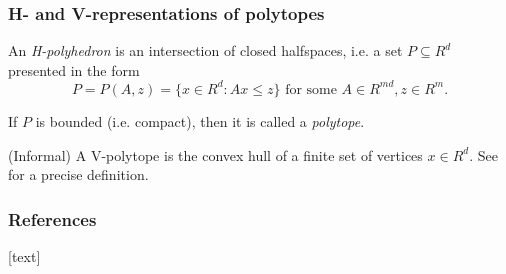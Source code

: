 \begin{frame}
\frametitle{H- and V-representations of polytopes}

\begin{definition}
An \emph{H-polyhedron} is an intersection of closed halfspaces, i.e. a set $P \subseteq R^d$ presented in the form
\begin{equation*}
P = P(A,z)=\{ x \in R^d: Ax \leq z\} \textrm{ for some } A \in R^{m d}, z \in R^m.
\end{equation*}
\end{definition}

If $P$ is bounded (i.e. compact), then it is called a \emph{polytope}.

\begin{definition}
(Informal) A V-polytope is the convex hull of a finite set of vertices $x \in R^d$. See \cite{ziegler2012lectures} for a precise definition.
\end{definition}


\end{frame}

\begin{frame}[allowframebreaks]
    \frametitle{References}
    [text]
    
    
\end{frame}

